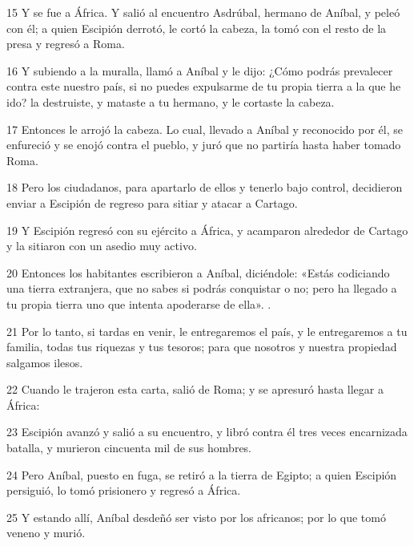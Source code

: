 \par 15 Y se fue a África. Y salió al encuentro Asdrúbal, hermano de Aníbal, y peleó con él; a quien Escipión derrotó, le cortó la cabeza, la tomó con el resto de la presa y regresó a Roma.

\par 16 Y subiendo a la muralla, llamó a Aníbal y le dijo: ¿Cómo podrás prevalecer contra este nuestro país, si no puedes expulsarme de tu propia tierra a la que he ido? la destruiste, y mataste a tu hermano, y le cortaste la cabeza.

\par 17 Entonces le arrojó la cabeza. Lo cual, llevado a Aníbal y reconocido por él, se enfureció y se enojó contra el pueblo, y juró que no partiría hasta haber tomado Roma.

\par 18 Pero los ciudadanos, para apartarlo de ellos y tenerlo bajo control, decidieron enviar a Escipión de regreso para sitiar y atacar a Cartago.

\par 19 Y Escipión regresó con su ejército a África, y acamparon alrededor de Cartago y la sitiaron con un asedio muy activo.

\par 20 Entonces los habitantes escribieron a Aníbal, diciéndole: «Estás codiciando una tierra extranjera, que no sabes si podrás conquistar o no; pero ha llegado a tu propia tierra uno que intenta apoderarse de ella». .

\par 21 Por lo tanto, si tardas en venir, le entregaremos el país, y le entregaremos a tu familia, todas tus riquezas y tus tesoros; para que nosotros y nuestra propiedad salgamos ilesos.

\par 22 Cuando le trajeron esta carta, salió de Roma; y se apresuró hasta llegar a África:

\par 23 Escipión avanzó y salió a su encuentro, y libró contra él tres veces encarnizada batalla, y murieron cincuenta mil de sus hombres.

\par 24 Pero Aníbal, puesto en fuga, se retiró a la tierra de Egipto; a quien Escipión persiguió, lo tomó prisionero y regresó a África.

\par 25 Y estando allí, Aníbal desdeñó ser visto por los africanos; por lo que tomó veneno y murió.

